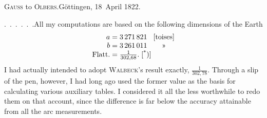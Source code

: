 \begin{center}
\textsc{Gauss} to \textsc{Olbers}.\quad Göttingen, 18~April 1822.
\end{center}

\par\noindent\hspace*{\parindent}.\ .\ .\ .\ .\ .\quad All my computations are based on the following dimensions of the Earth
\[
\begin{array}{@{}r@{\;}c@{\;}l@{\;}c@{}}
a & = & 3\,271\,821 & \text{[toises]} \\
b & = & 3\,261\,011 & \text{»} \\
\text{Flatt.} & = & \tfrac{1}{302{,}68}.\;\text{[\textsuperscript{*})]} &
\end{array}
\]
I had actually intended to adopt \textsc{Walbeck}'s result exactly, \(\frac{1}{302{,}78}\).
Through a slip of the pen, however, I had long ago used the former value as the basis for calculating various auxiliary tables. I considered it all the less worthwhile to redo them on that account, since the difference is far below the accuracy attainable from all the arc measurements.

